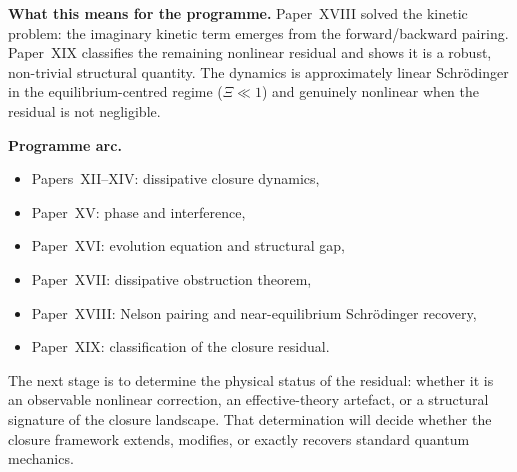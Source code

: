 \documentclass[12pt]{article}
\begin{document}
\textbf{What this means for the programme.} Paper~XVIII solved the kinetic problem: the imaginary kinetic term emerges from the forward/backward pairing. Paper~XIX classifies the remaining nonlinear residual and shows it is a robust, non-trivial structural quantity. The dynamics is approximately linear Schr\"odinger in the equilibrium-centred regime ($\Xi \ll 1$) and genuinely nonlinear when the residual is not negligible.

\textbf{Programme arc.}
\begin{itemize}
    \item Papers~XII--XIV: dissipative closure dynamics,
    \item Paper~XV: phase and interference,
    \item Paper~XVI: evolution equation and structural gap,
    \item Paper~XVII: dissipative obstruction theorem,
    \item Paper~XVIII: Nelson pairing and near-equilibrium Schr\"odinger recovery,
    \item Paper~XIX: classification of the closure residual.
\end{itemize}

The next stage is to determine the physical status of the residual: whether it is an observable nonlinear correction, an effective-theory artefact, or a structural signature of the closure landscape. That determination will decide whether the closure framework extends, modifies, or exactly recovers standard quantum mechanics.



\end{document}
